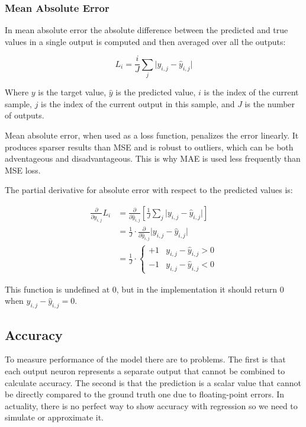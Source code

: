 \documentclass[a4paper]{article}
\newcommand{\abs}[1]{\lvert#1\rvert}
\begin{document}
\subsubsection*{Mean Absolute Error}
In mean absolute error the absolute difference between the predicted and true values in a single output is computed and then averaged over all the outputs:

\begin{equation*}
    L_i = \frac{i}{J}\sum_j\abs{y_{i,j}-\hat{y}_{i,j}}
\end{equation*}

Where $y$ is the target value, $\hat{y}$ is the predicted value, $i$ is the index of the current sample, $j$ is the index of the current output in this sample, and $J$ is the number of outputs.

Mean absolute error, when used as a loss function, penalizes the error linearly. It produces sparser results than MSE and is robust to outliers, which can be both adventageous and disadvantageous. This is why MAE is used less frequently than MSE loss.

The partial derivative for absolute error with respect to the predicted values is:

\begin{align*}
    \frac{\partial}{\partial\hat{y}_{i,j}}L_i &= \frac{\partial}{\partial\hat{y}_{i,j}} \left[ \frac{1}{J}\sum_j\abs{y_{i,j}-\hat{y}_{i,j}} \right] \\
    &= \frac{1}{J} \cdot \frac{\partial}{\partial\hat{y}_{i,j}}\abs{y_{i,j}-\hat{y}_{i,j}} \\
    &= \frac{1}{J} \cdot \begin{cases}
        +1 & y_{i,j} - \hat{y}_{i,j} > 0 \\
        -1 & y_{i,j} - \hat{y}_{i,j} < 0
    \end{cases}
\end{align*}

This function is undefined at 0, but in the implementation it should return 0 when $y_{i,j} - \hat{y}_{i,j} = 0$.

\subsection*{Accuracy}
To measure performance of the model there are to problems. The first is that each output neuron represents a separate output that cannot be combined to calculate accuracy. The second is that the prediction is a scalar value that cannot be directly compared to the ground truth one due to floating-point errors. In actuality, there is no perfect way to show accuracy with regression so we need to simulate or approximate it.
\end{document}
